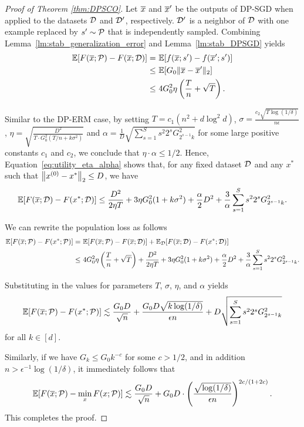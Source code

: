 \begin{proof}[Proof of Theorem \ref{thm:DPSCO}]
Let $\overline{x}$ and $\overline{x}'$ be the outputs of DP-SGD when applied to the datasets $\mathcal D$ and $\mathcal D'$, respectively.
$\mathcal D'$ is a neighbor of $\mathcal D$ with one example replaced by $s' \sim \mathcal P$ that is independently sampled. 
Combining Lemma~\ref{lm:stab_generalization_error} and Lemma~\ref{lm:stab_DPSGD} yields
\begin{align*}
    \mathbb{E} [F(\overline{x}; \mathcal P)-F(\overline{x};\mathcal D)]= &~ \mathbb{E}[f(\overline{x};s')-f(\overline{x}';s')]\\
    \leq & ~\mathbb{E} [G_0 \|\overline{x}-\overline{x}'\|_2]\\
    \leq & ~ 4G_0^2\eta \left( \frac{T}{n}+\sqrt{T}\right).
\end{align*}

Similar to the DP-ERM case, 
by setting $T=c_1 (n^2 + d \log^2 d)$,
$\sigma=\frac{c_2\sqrt{T\log(1/\delta)}}{n\epsilon}$, 
$\eta=\sqrt{\frac{D^{2}}{T \cdot G_{0}^{2}(T/n+k\sigma^{2})}}$
and $\alpha=\frac{1}{D} \sqrt{\sum_{s=1}^S s^2 2^{s}G_{2^{s-1}k}^{2}}$ for some large positive constants $c_1$ and $c_2$, we conclude that $\eta\cdot\alpha\leq 1/2$. Hence, Equation~\eqref{eq:utility_eta_alpha} shows that, for any fixed dataset $\mathcal D$ and any $x^*$ such that $\left\lVert x^{(0)} - x^*\right\rVert_2 \le D$, we have
\begin{align*}
\mathbb{E} [F(\overline{x};\mathcal D)- F(x^{*};\mathcal D)]\leq\frac{D^{2}}{2\eta T}+3\eta G_{0}^{2}(1+k\sigma^{2})+\frac{\alpha}{2}D^{2}+\frac{3}{\alpha}\sum_{s=1}^S s^2 2^{s}G_{2^{s-1}k}^{2}.    
\end{align*}

We can rewrite the population loss as follows
\begin{align*}
\mathbb{E}[F(\overline{x}; \mathcal P)-F(x^*; \mathcal P)] =& ~ \mathbb{E}[F(\overline{x}; \mathcal P)-F(\overline{x};\mathcal D)]+\mathbb{E}_{\mathcal D}[F(\overline{x};\mathcal D)-F(x^*;\mathcal D)]\\
\leq &~ 
    4G_0^2\eta \left( \frac{T}{n}+\sqrt{T} \right) + 
    \frac{D^{2}}{2\eta T} + 
    3\eta G_{0}^{2}(1+k\sigma^{2}) + 
    \frac{\alpha}{2}D^{2} + 
    \frac{3}{\alpha}\sum_{s=1}^S s^2 2^{s}G_{2^{s-1}k}^{2}.
\end{align*}

Substituting in the values for parameters $T$, $\sigma$, $\eta$, and $\alpha$ yields
\begin{align*}
    \mathbb{E}[F(\overline{x}; \mathcal P)-F(x^*; \mathcal P)]\lesssim \frac{G_0D}{\sqrt{n}}+\frac{G_{0}D\sqrt{k\log(1/\delta)}}{\epsilon n}+D\sqrt{\sum_{s=1}^{S}s^2 2^{s}G_{2^{s-1}k}^{2}} 
\end{align*}
for all $k \in [d]$.

Similarly, if we have $G_k\leq G_0 k^{-c}$ for some $c>1/2$, and in addition $n > \epsilon^{-1} \log(1/\delta)$, it immediately follows that
\begin{align*}
    \mathbb{E}[F(\overline{x}; \mathcal P)-\min_x F(x; \mathcal P)]\lesssim \frac{G_0D}{\sqrt{n}}+G_{0}D\cdot \left( \frac{\sqrt{\log(1/\delta)}}{\epsilon n} \right)^{2c/(1+2c)}.
\end{align*}
This completes the proof.
\end{proof}